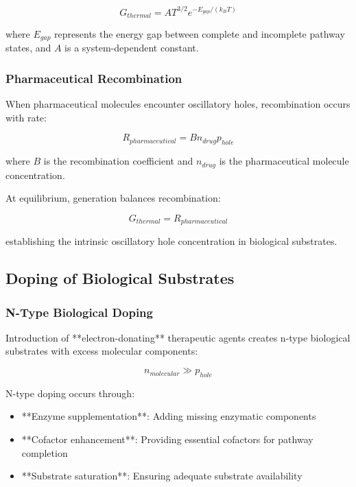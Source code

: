 \begin{equation}
G_{thermal} = A T^{3/2} e^{-E_{gap}/(k_B T)}
\end{equation}

where $E_{gap}$ represents the energy gap between complete and incomplete pathway states, and $A$ is a system-dependent constant.

\subsubsection{Pharmaceutical Recombination}

When pharmaceutical molecules encounter oscillatory holes, recombination occurs with rate:

\begin{equation}
R_{pharmaceutical} = B n_{drug} p_{hole}
\end{equation}

where $B$ is the recombination coefficient and $n_{drug}$ is the pharmaceutical molecule concentration.

At equilibrium, generation balances recombination:

\begin{equation}
G_{thermal} = R_{pharmaceutical}
\end{equation}

establishing the intrinsic oscillatory hole concentration in biological substrates.

\subsection{Doping of Biological Substrates}

\subsubsection{N-Type Biological Doping}

Introduction of **electron-donating** therapeutic agents creates n-type biological substrates with excess molecular components:

\begin{equation}
n_{molecular} \gg p_{hole}
\end{equation}

N-type doping occurs through:
\begin{itemize}
\item **Enzyme supplementation**: Adding missing enzymatic components
\item **Cofactor enhancement**: Providing essential cofactors for pathway completion
\item **Substrate saturation**: Ensuring adequate substrate availability
\end{itemize}

